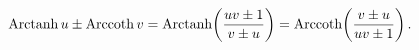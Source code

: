 \[\mathop{\mathrm{Arctanh}\/}\nolimits u\pm\mathop{\mathrm{Arccoth}\/}\nolimits v%
=\mathop{\mathrm{Arctanh}\/}\nolimits\!\left(\frac{uv\pm 1}{v\pm u}\right)=%
\mathop{\mathrm{Arccoth}\/}\nolimits\!\left(\frac{v\pm u}{uv\pm 1}\right).\]